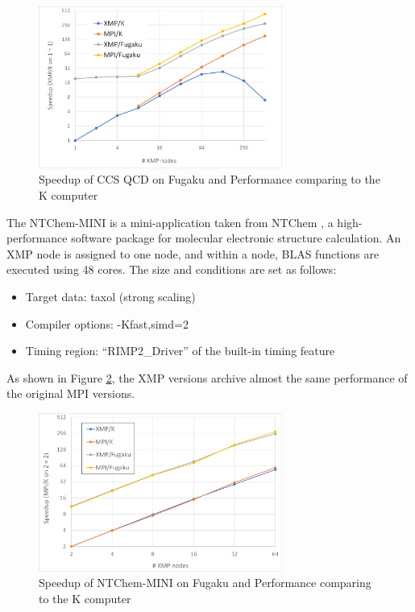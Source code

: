 ﻿\documentclass[graybox]{svmult}
\begin{document}
\begin{figure}[thb]
\begin{center}
\includegraphics[width=8cm]{./figure/Perf-QCD.png}
\caption{Speedup of CCS QCD on Fugaku and Performance comparing to the K computer}
\label{fig-QCD}
\end{center}
\end{figure}

The NTChem-MINI is a mini-application taken from NTChem \cite{NTChem}, a high-performance software package for molecular electronic structure calculation. An XMP node is assigned to one node, and within a node, BLAS functions are executed using 48 cores.
The size and conditions are set as follows:

\begin{itemize}
\item Target data: taxol (strong scaling)
\item Compiler options: -Kfast,simd=2
\item Timing region: “RIMP2\_Driver” of the built-in timing feature
\end{itemize}

As shown in Figure \ref{fig-NTchem}, the XMP versions archive almost the same performance of the original MPI versions.

\begin{figure}[thb]
\begin{center}
\includegraphics[width=8cm]{./figure/Perf-NTchem.png}
\caption{Speedup of NTChem-MINI on Fugaku and Performance comparing to the K computer}
\label{fig-NTchem}
\end{center}
\end{figure}
\end{document}
